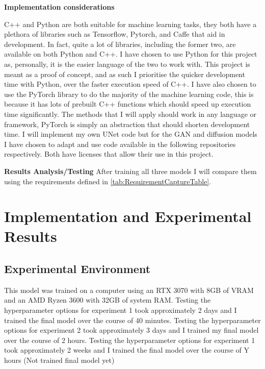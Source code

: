 \documentclass{UoYCSproject}
\begin{document}
\textbf{Implementation considerations}

C++ and Python are both suitable for machine learning tasks, they both have a plethora of libraries such as Tensorflow, Pytorch, and Caffe that aid in development. In fact, quite a lot of libraries, including the former two, are available on both Python and C++. I have chosen to use Python for this project as, personally, it is the easier language of the two to work with. This project is meant as a proof of concept, and as such I prioritise the quicker development time with Python, over the faster execution speed of C++. I have also chosen to use the PyTorch library to do the majority of the machine learning code, this is because it has lots of prebuilt C++ functions which should speed up execution time significantly. The methods that I will apply should work in any language or framework, PyTorch is simply an abstraction that should shorten development time. I will implement my own UNet code but for the GAN and diffusion models I have chosen to adapt and use code available in the following repositories \cite{PytorchPix2Pix, JanspiryPalette} respectively. Both have licenses that allow their use in this project. 

\textbf{Results Analysis/Testing}
After training all three models I will compare them using the requirements defined in \ref{tab:RequirementCaptureTable}.

\chapter{Implementation and Experimental Results}




\section{Experimental Environment}

This model was trained on a computer using an RTX 3070 with 8GB of VRAM and an AMD Ryzen 3600 with 32GB of system RAM.
Testing the hyperparameter options for experiment 1 took approximately 2 days and I trained the final model over the course of 40 minutes.
Testing the hyperparameter options for experiment 2 took approximately 3 days and I trained my final model over the course of 2 hours.  
Testing the hyperparameter options for experiment 1 took approximately 2 weeks and I trained the final model over the course of Y hours (Not trained final model yet)
\end{document}
